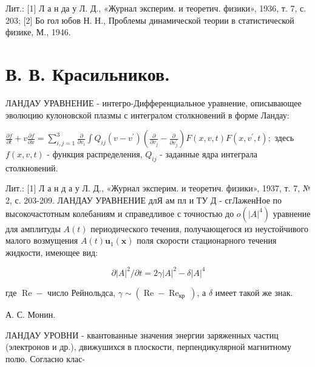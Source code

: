 \documentclass[10pt]{article}
\begin{document}
Лит.: [1] Л а н да у Л. Д., «Журнал эксперим. и теоретич. физики», 1936, т. 7, с. 203; [2] Бо гол юбов Н. Н., Проблемы динамической теории в статистической физике, М., 1946.



\section{В. В. Красильников.}

ЛАНДАУ УРАВНЕНИЕ - интегро-Дифференциальное уравнение, описывающее эволюцию кулоновской плазмы с интегралом столкновений в форме Ландау:



$\frac{\partial f}{\partial t}+v \frac{\partial f}{\partial x}=\sum_{i, j=1}^{3} \frac{\partial}{\partial v_{i}} \int Q_{i j}\left(v-v^{\prime}\right)\left(\frac{\partial}{\partial v_{j}}-\frac{\partial}{\partial v_{j}^{\prime}}\right) F(x, v, t) F\left(x, v^{\prime}, t\right) ;$ здесь $f(x, v, t)$ - функция распределения, $Q_{i j}$ - заданные ядра интеграла столкновений.



Лит.: [1] Л а н д а у Л. Д., «Журнал эксперим. и теоретич. физики», 1937, т. 7, № 2, с. 203-209. ЛАНДАУ УРАВНЕНИЕ длЯ ам пл и ТУ Д - сгЛаженНое по высокочастотным колебаниям и справедливое с точностью до $o\left(|A|^{4}\right)$ уравнение для амплитуды $A(t)$ периодического течения, получающегося из неустойчивого малого возмущения $A(t) \boldsymbol{u}_{1}(\boldsymbol{x})$ поля скорости стационарного течения жидкости, имеющее вид:



\[

\partial|A|^{2} / \partial t=2 \gamma|A|^{2}-\delta|A|^{4}

\]



где $\operatorname{Re}-$ число Рейнольдса, $\gamma \sim\left(\operatorname{Re}-\operatorname{Re}_{\text {кр }}\right)$, а $\delta$ имеет такой же знак.



А. С. Монин.



ЛАНДАУ УРОВНИ - квантованные значения энергии заряженных частиц (электронов и др.), движушихся в плоскости, перпендикулярной магнитному полю. Согласно клас-
\end{document}
